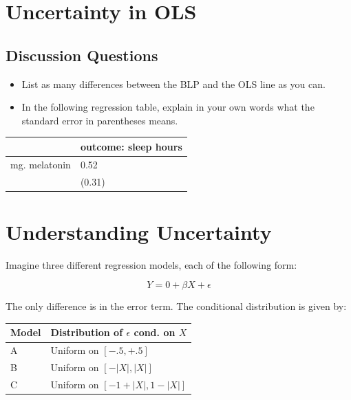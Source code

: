 \documentclass[
]{book}
\providecommand{\tightlist}{%
  \setlength{\itemsep}{0pt}\setlength{\parskip}{0pt}}
\theoremstyle{definition}
\theoremstyle{definition}
\theoremstyle{definition}
\theoremstyle{definition}
\theoremstyle{remark}
\begin{document}
\hypertarget{uncertainty-in-ols}{%
\section{Uncertainty in OLS}\label{uncertainty-in-ols}}

\hypertarget{discussion-questions-1}{%
\subsection{Discussion Questions}\label{discussion-questions-1}}

\begin{itemize}
\tightlist
\item
  List as many differences between the BLP and the OLS line as you can.
\item
  In the following regression table, explain in your own words what the standard error in parentheses means.
\end{itemize}

\begin{longtable}[]{@{}ll@{}}
\toprule\noalign{}
& outcome: sleep hours \\
\midrule\noalign{}
\endhead
\bottomrule\noalign{}
\endlastfoot
mg. melatonin & 0.52 \\
& (0.31) \\
\end{longtable}

\hypertarget{understanding-uncertainty}{%
\section{Understanding Uncertainty}\label{understanding-uncertainty}}

Imagine three different regression models, each of the following form:

\[
  Y = 0 + \beta X + \epsilon
\]

The only difference is in the error term. The conditional distribution is given by:

\begin{longtable}[]{@{}ll@{}}
\toprule\noalign{}
Model & Distribution of \(\epsilon\) cond. on \(X\) \\
\midrule\noalign{}
\endhead
\bottomrule\noalign{}
\endlastfoot
A & Uniform on \([-.5, +.5]\) \\
B & Uniform on \([ - |X|, |X| ]\) \\
C & Uniform on \([ -1 + |X|, 1- |X| ]\) \\
\end{longtable}
\end{document}
